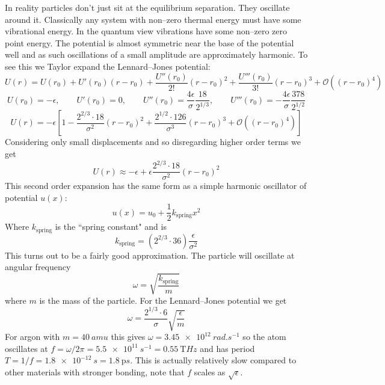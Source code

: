     In reality particles don't just sit at the equilibrium separation.
    They oscillate around it.
    Classically any system with non--zero thermal energy must have some vibrational energy.
    In the quantum view vibrations have some non--zero zero point energy.
    The potential is almost symmetric near the base of the potential well and as such oscillations of a small amplitude are approximately harmonic.
    To see this we Taylor expand the Lennard--Jones potential:
    \[U(r) = U(r_0) + U'(r_0)(r - r_0) + \frac{U''(r_0)}{2!}(r - r_0)^2 + \frac{U'''(r_0)}{3!}(r - r_0)^3 + \mathcal{O}\left((r - r_0)^4\right)\]
    \[U(r_0) = -\epsilon,\qquad U'(r_0) = 0,\qquad U''(r_0) = \frac{4\epsilon}{\sigma}\frac{18}{2^{1/3}},\qquad U'''(r_0) = -\frac{4\epsilon}{\sigma}\frac{378}{2^{1/2}}\]
    \[U(r) = -\epsilon\left[1 - \frac{2^{2/3}\cdot 18}{\sigma^2}(r - r_0)^2 + \frac{2^{1/2}\cdot 126}{\sigma^3}(r - r_0)^3 + \mathcal{O}\left((r - r_0)^4\right)\right]\]
    Considering only small displacements and so disregarding higher order terms we get
    \[U(r)\approx -\epsilon + \epsilon\frac{2^{2/3}\cdot 18}{\sigma^2}(r - r_0)^2\]
    This second order expansion has the same form as a simple harmonic oscillator of potential \(u(x)\):
    \[u(x) = u_0 + \frac{1}{2}k_\text{spring}x^2\]
    Where \(k_\text{spring}\) is the ``spring constant" and is
    \[k_\text{spring} = (2^{2/3}\cdot 36)\frac{\epsilon}{\sigma^2}\]
    This turns out to be a fairly good approximation.
    The particle will oscillate at angular frequency
    \[\omega = \sqrt{\frac{k_\text{spring}}{m}}\]
    where \(m\) is the mass of the particle.
    For the Lennard--Jones potential we get
    \[\omega = \frac{2^{1/3}\cdot 6}{\sigma}\sqrt{\frac{\epsilon}{m}}\]
    For argon with \(m = \SI{40}{amu}\) this gives \(\omega = \SI{3.45e12}{rad.s^{-1}}\) so the atom oscillates at \(f = \omega/2\pi = \SI{5.5e11}{s^{-1}} = \SI{0.55}{\tera Hz}\) and has period \(T = 1/f = \SI{1.8e-12}{s} = \SI{1.8}{\pico s}\).
    This is actually relatively slow compared to other materials with stronger bonding, note that \(f\) scales as \(\sqrt{\epsilon}\).
    
